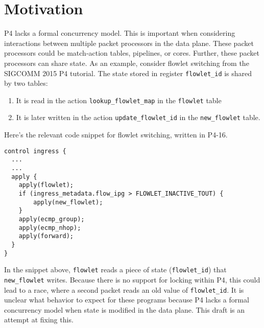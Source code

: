 \section{Motivation}
P4 lacks a formal concurrency model. This is important when considering
interactions between multiple packet processors in the data plane. These packet
processors could be match-action tables, pipelines, or cores. Further, these
packet processors can share state. As an example, consider flowlet switching
from the SIGCOMM 2015 P4 tutorial. The state stored in register
\texttt{flowlet\_id} is shared by two tables:

\begin{enumerate}

\item It is read in the action \texttt{lookup\_flowlet\_map} in the
\texttt{flowlet} table

\item It is later written in the action \texttt{update\_flowlet\_id} in the
\texttt{new\_flowlet} table.

\end{enumerate}

Here's the relevant code snippet for flowlet switching, written in P4-16.
\begin{verbatim}
control ingress {
  ...
  ...
  apply {
    apply(flowlet);
    if (ingress_metadata.flow_ipg > FLOWLET_INACTIVE_TOUT) {
        apply(new_flowlet);
    }
    apply(ecmp_group);
    apply(ecmp_nhop);
    apply(forward);
  }
}
\end{verbatim}
In the snippet above, \texttt{flowlet} reads a piece of state
(\texttt{flowlet\_id}) that \texttt{new\_flowlet} writes. Because there is no
support for locking within P4, this could lead to a race, where a second packet
reads an old value of \texttt{flowlet\_id}. It is unclear what behavior to
expect for these programs because P4 lacks a formal concurrency model when
state is modified in the data plane. This draft is an attempt at fixing this.
